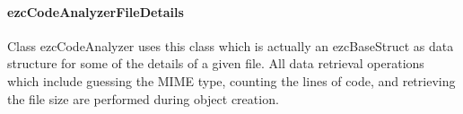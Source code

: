 \documentclass[10pt,final,a4paper,oneside]{article}
\begin{document}


\paragraph{ezcCodeAnalyzerFileDetails}
Class ezcCodeAnalyzer uses this class
which is actually an ezcBaseStruct
as data structure for some of the details of a given file.
All data retrieval operations which include
guessing the MIME type, counting the lines of code,
and retrieving the file size
are performed during object creation.

\end{document}

